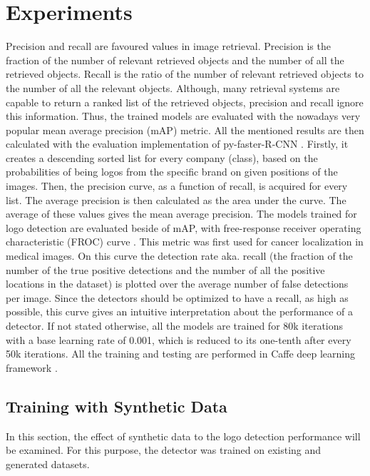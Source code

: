 \chapter{Experiments}\label{c:experiments}

Precision and recall are favoured values in image retrieval. Precision is the fraction of the number of relevant retrieved objects and the number of all the retrieved objects. Recall is the ratio of the number of relevant retrieved objects to the number of all the relevant objects. Although, many retrieval systems are capable to return a ranked list of the retrieved objects, precision and recall ignore this information. Thus, the trained models are evaluated with the nowadays very popular mean average precision (mAP) metric.
\bigbreak
All the mentioned results are then calculated with the evaluation implementation of py-faster-R-CNN \cite{Girshick2017} \cite{NIPS2015_5638}. Firstly, it creates a descending sorted list for every company (class), based on the probabilities of being logos from the specific brand on given positions of the images. Then, the precision curve, as a function of recall, is acquired for every list. The average precision is then calculated as the area under the curve. The average of these values gives the mean average precision.
\bigbreak
The models trained for logo detection are evaluated beside of mAP, with free-response receiver operating characteristic (FROC) curve \cite{MillerTheFROC1969}. This metric was first used for cancer localization in medical images. On this curve the detection rate aka. recall (the fraction of the number of the true positive detections and the number of all the positive locations in the dataset) is plotted over the average number of false detections per image. Since the detectors should be optimized to have a recall, as high as possible, this curve gives an intuitive interpretation about the performance of a detector.
\bigbreak
If not stated otherwise, all the models are trained for 80k iterations with a base learning rate of 0.001, which is reduced to its one-tenth after every 50k iterations. All the training and testing are performed in Caffe deep learning framework \cite{Jia:2014:CCA:2647868.2654889}.
\bigbreak
\section{Training with Synthetic Data}
In this section, the effect of synthetic data to the logo detection performance will be examined. For this purpose, the detector was trained on existing and generated datasets.


